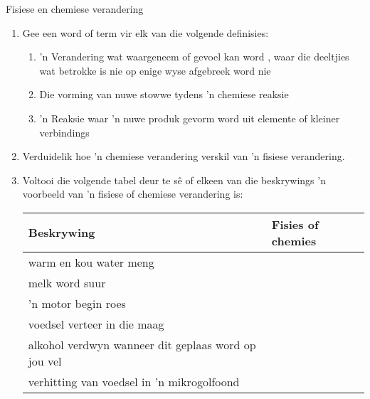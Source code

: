             \begin{eocexercises}{Fisiese en chemiese verandering}
            \nopagebreak
      \label{m38711*id65631}\begin{enumerate}[noitemsep, label=\textbf{\arabic*}. ] 
            \label{m38711*uid6234}\item Gee een word of term vir elk van die volgende definisies:
\label{m38711*id632243}\begin{enumerate}[noitemsep, label=\textbf{\alph*}. ] 
            \item 'n Verandering wat waargeneem of gevoel kan word , waar die deeltjies wat betrokke is nie op enige wyse afgebreek word nie
\item Die vorming van nuwe stowwe tydens 'n chemiese reaksie
\item 'n Reaksie waar 'n nuwe produk gevorm word uit elemente of kleiner verbindings \end{enumerate}
\label{m38711*id6244}\item Verduidelik hoe 'n chemiese verandering verskil van 'n fisiese verandering.\newline
\label{m38711*uid52}\item Voltooi die volgende tabel deur te sê of elkeen van die beskrywings 'n voorbeeld van 'n fisiese of chemiese verandering is:
          \begin{table}[H]
        \begin{center}
      \label{m38711*id65648}
    \noindent
      \begin{tabular}{|l|l|}\hline
        \textbf{Beskrywing} &
        \textbf{Fisies of chemies} \\ \hline
        warm en kou water meng &
     \\ \hline
        melk word suur &
     \\ \hline
        'n motor begin roes &
       \\ \hline
        voedsel verteer in die maag &
       \\ \hline
        alkohol verdwyn wanneer dit geplaas word op jou vel &
       \\ \hline
       verhitting van voedsel in 'n mikrogolfoond &

\end{tabular}
\end{center}
\end{table}
\end{enumerate}
\end{eocexercises}
